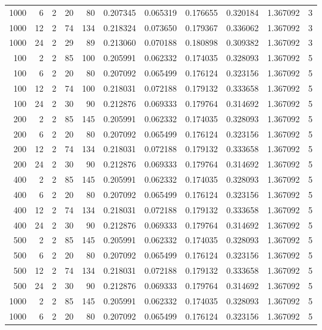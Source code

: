 \begin{table}
\begin{tabular}{rrrrrrrrrrr}
1000 & 6 & 2 & 20 & 80 & 0.207345 & 0.065319 & 0.176655 & 0.320184 & 1.367092 & 3 \\
1000 & 12 & 2 & 74 & 134 & 0.218324 & 0.073650 & 0.179367 & 0.336062 & 1.367092 & 3 \\
1000 & 24 & 2 & 29 & 89 & 0.213060 & 0.070188 & 0.180898 & 0.309382 & 1.367092 & 3 \\
100 & 2 & 2 & 85 & 100 & 0.205991 & 0.062332 & 0.174035 & 0.328093 & 1.367092 & 5 \\
100 & 6 & 2 & 20 & 80 & 0.207092 & 0.065499 & 0.176124 & 0.323156 & 1.367092 & 5 \\
100 & 12 & 2 & 74 & 100 & 0.218031 & 0.072188 & 0.179132 & 0.333658 & 1.367092 & 5 \\
100 & 24 & 2 & 30 & 90 & 0.212876 & 0.069333 & 0.179764 & 0.314692 & 1.367092 & 5 \\
200 & 2 & 2 & 85 & 145 & 0.205991 & 0.062332 & 0.174035 & 0.328093 & 1.367092 & 5 \\
200 & 6 & 2 & 20 & 80 & 0.207092 & 0.065499 & 0.176124 & 0.323156 & 1.367092 & 5 \\
200 & 12 & 2 & 74 & 134 & 0.218031 & 0.072188 & 0.179132 & 0.333658 & 1.367092 & 5 \\
200 & 24 & 2 & 30 & 90 & 0.212876 & 0.069333 & 0.179764 & 0.314692 & 1.367092 & 5 \\
400 & 2 & 2 & 85 & 145 & 0.205991 & 0.062332 & 0.174035 & 0.328093 & 1.367092 & 5 \\
400 & 6 & 2 & 20 & 80 & 0.207092 & 0.065499 & 0.176124 & 0.323156 & 1.367092 & 5 \\
400 & 12 & 2 & 74 & 134 & 0.218031 & 0.072188 & 0.179132 & 0.333658 & 1.367092 & 5 \\
400 & 24 & 2 & 30 & 90 & 0.212876 & 0.069333 & 0.179764 & 0.314692 & 1.367092 & 5 \\
500 & 2 & 2 & 85 & 145 & 0.205991 & 0.062332 & 0.174035 & 0.328093 & 1.367092 & 5 \\
500 & 6 & 2 & 20 & 80 & 0.207092 & 0.065499 & 0.176124 & 0.323156 & 1.367092 & 5 \\
500 & 12 & 2 & 74 & 134 & 0.218031 & 0.072188 & 0.179132 & 0.333658 & 1.367092 & 5 \\
500 & 24 & 2 & 30 & 90 & 0.212876 & 0.069333 & 0.179764 & 0.314692 & 1.367092 & 5 \\
1000 & 2 & 2 & 85 & 145 & 0.205991 & 0.062332 & 0.174035 & 0.328093 & 1.367092 & 5 \\
1000 & 6 & 2 & 20 & 80 & 0.207092 & 0.065499 & 0.176124 & 0.323156 & 1.367092 & 5 \\

\end{tabular}
\end{table}
